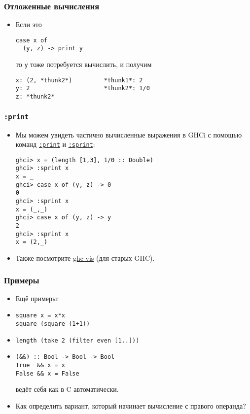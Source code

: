 \documentclass[11pt]{beamer}
\begin{document}
\begin{frame}[fragile]
\frametitle{Отложенные вычисления}
\begin{itemize}
    \item Если это
\begin{lstlisting}[basicstyle=\ttfamily\small]
case x of
  (y, z) -> print y
\end{lstlisting}
то \lstinline|y| тоже потребуется вычислить, и получим \pause
\begin{lstlisting}[basicstyle=\ttfamily\small]
x: (2, *thunk2*)         *thunk1*: 2
y: 2                     *thunk2*: 1/0
z: *thunk2*
\end{lstlisting}
\end{itemize}
\end{frame}

\begin{frame}[fragile]
\frametitle{\lstinline|:print|}
\begin{itemize}
    \item Мы можем увидеть частично вычисленные выражения в GHCi с помощью команд \href{https://downloads.haskell.org/~ghc/8.6.3/docs/html/users_guide/ghci.html#ghci-cmd-:print}{\lstinline|:print|} и \href{https://downloads.haskell.org/~ghc/8.6.3/docs/html/users_guide/ghci.html#ghci-cmd-:sprint}{\lstinline|:sprint|}:
\begin{lstlisting}[basicstyle=\ttfamily\small]
ghci> x = (length [1,3], 1/0 :: Double)
ghci> :sprint x
x = _
ghci> case x of (y, z) -> 0
0
ghci> :sprint x
x = (_,_)
ghci> case x of (y, z) -> y
2
ghci> :sprint x
x = (2,_)
\end{lstlisting}
    \pause
    \item Также посмотрите \href{http://felsin9.de/nnis/ghc-vis/}{ghc-vis} (для старых GHC).
\end{itemize}
\end{frame}

\begin{frame}[fragile]
\frametitle{Примеры}
\begin{itemize}
    \item Ещё примеры:
    \pause
    \item
\begin{lstlisting}
square x = x*x
square (square (1+1))
\end{lstlisting}
    \item \lstinline|length (take 2 (filter even [1..]))|
\pause
    \item 
\begin{lstlisting}
(&&) :: Bool -> Bool -> Bool
True  && x = x
False && x = False
\end{lstlisting}
    ведёт себя как в C автоматически.
    \pause
    \item Как определить вариант, который начинает вычисление с правого операнда?
\end{itemize}
\end{frame}
\end{document}
